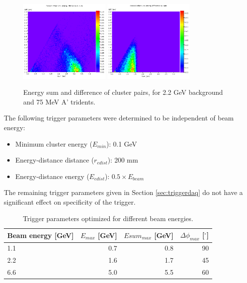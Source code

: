 \begin{figure}[ht]
	\includegraphics[width=0.4\textwidth]{performance/ediff_22}
	\includegraphics[width=0.4\textwidth]{performance/ediff_22_075mev}
	\caption{\small{Energy sum and difference of cluster pairs, for 2.2 GeV background and 75 MeV A' tridents.}}
	\label{fig:ediff}
\end{figure}

The following trigger parameters were determined to be independent of beam energy:
\begin{itemize}
	\item Minimum cluster energy ($E_{min}$): 0.1 GeV
	\item Energy-distance distance ($r_{edist}$): 200 mm
	\item Energy-distance energy ($E_{edist}$): $0.5\times E_{beam}$
\end{itemize}

The remaining trigger parameters given in Section \ref{sec:triggerdaq} do not have a significant effect on specificity of the trigger.

\begin{table}
	\begin{tabular}{|l|r|r|r|}
		\hline
		Beam energy [GeV] & $E_{max}$ [GeV] & $Esum_{max}$ [GeV] & $\Delta\phi_{max}$ [$^\circ$] \\
		\hline
		1.1	&	0.7	&	0.8	&	90\\
		2.2	&	1.6	&	1.7	&	45\\
		6.6	&	5.0	&	5.5	&	60\\
		\hline
	\end{tabular}
	\caption{ {\small Trigger parameters optimized for different beam energies.}
	\label{tab:trigcuts}}
\end{table}

